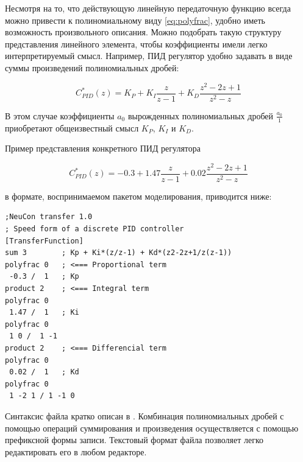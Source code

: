 Несмотря на то, что действующую линейную передаточную функцию всегда
можно привести к полиномиальному виду \ref{eq:polyfrac}, удобно иметь
возможность произвольного описания.  Можно подобрать такую структуру
представления линейного элемента, чтобы коэффициенты имели легко
интерпретируемый смысл.  Например, ПИД регулятор удобно задавать в
виде суммы произведений полиномиальных дробей:

\begin{equation}\label{eq:pid}
C_{PID}^*(z)=K_P+K_I\frac{z}{z-1}+K_D\frac{z^2-2z+1}{z^2-z}
\end{equation}

В этом случае коэффициенты $a_0$ вырожденных полиномиальных дробей
$\frac{a_0}{1}$ приобретают общеизвестный смысл $K_P$, $K_I$ и $K_D$.

Пример представления конкретного ПИД регулятора

\begin{equation}\label{eq:pid_example}
C_{PID}^*(z)=-0.3+1.47\frac{z}{z-1}+0.02\frac{z^2-2z+1}{z^2-z}
\end{equation}

\noindent в формате, воспринимаемом пакетом моделирования, приводится ниже:

\begin{verbatim}
;NeuCon transfer 1.0
; Speed form of a discrete PID controller
[TransferFunction]
sum 3		 ; Kp + Ki*(z/z-1) + Kd*(z2-2z+1/z(z-1))
polyfrac 0	 ; <=== Proportional term
 -0.3 /  1	 ; Kp
product 2	 ; <=== Integral term
polyfrac 0
 1.47 /  1	 ; Ki
polyfrac 0
 1 0 /  1 -1
product 2	 ; <=== Differencial term
polyfrac 0
 0.02 /  1	 ; Kd
polyfrac 0
 1 -2 1 / 1 -1 0
\end{verbatim}

Синтаксис файла кратко описан в .  Комбинация
полиномиальных дробей с помощью операций суммирования и произведения
осуществляется с помощью префиксной формы записи.  Текстовый формат
файла позволяет легко редактировать его в любом редакторе.

